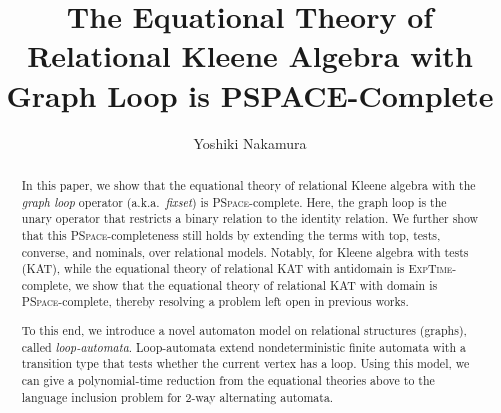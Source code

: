\documentclass[a4paper,UKenglish,cleveref, autoref, thm-restate]{lipics-v2021}
\title{The Equational Theory of Relational Kleene Algebra with Graph Loop is PSPACE-Complete}
\author{Yoshiki Nakamura}{Chiba University, Japan}{nakamura.yoshiki.ny@gmail.com}{https://orcid.org/0000-0003-4106-0408}{}%
\begin{document}
\maketitle

%
\begin{abstract}
In this paper, we show that the equational theory of relational Kleene algebra with the \emph{graph loop} operator (a.k.a.~\emph{fixset}) is \textsc{PSpace}-complete.
Here, the graph loop is the unary operator that restricts a binary relation to the identity relation.
We further show that this \textsc{PSpace}-completeness still holds by extending the terms with top, tests, converse, and nominals, over relational models.
Notably, for Kleene algebra with tests (KAT),
while the equational theory of relational KAT with antidomain is \textsc{ExpTime}-complete,
we show that the equational theory of relational KAT with domain is \textsc{PSpace}-complete,
thereby resolving a problem left open in previous works.

To this end,
we introduce a novel automaton model on relational structures (graphs), called \emph{loop-automata}.
Loop-automata extend nondeterministic finite automata with a transition type that tests whether the current vertex has a loop.
Using this model, we can give a polynomial-time reduction from the equational theories above to the language inclusion problem for 2-way alternating automata.

%
%
%

%
%
%
%
%
 \end{abstract}

%
%
%
%
%
%
%
%
%
%
%
%
%
%
%
%
%
%
%
%
%
\end{document}
